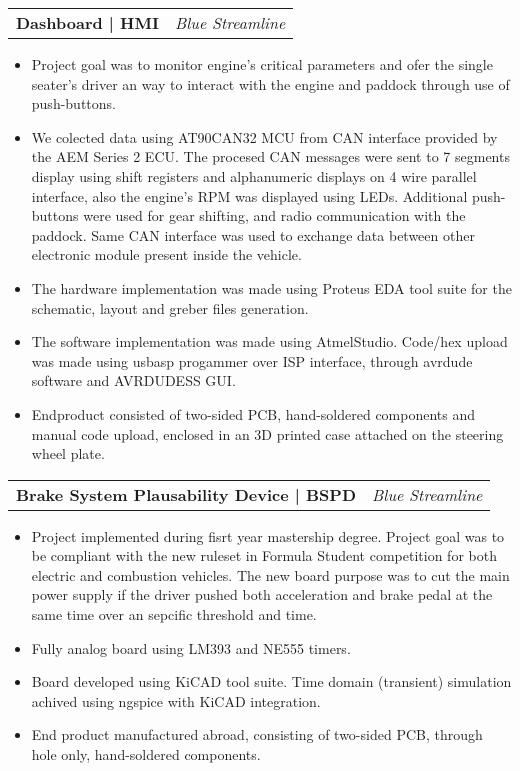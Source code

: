 \documentclass[letterpaper,11pt]{article}
\makeatletter
\newcommand{\resumeItem}[1]{
  \item\small{
    {#1 \vspace{-2pt}}
  }
}
\newcommand{\resumeProjectHeading}[2]{
    \vspace{-2pt}\item
    \begin{tabular*}{0.97\textwidth}{l@{\extracolsep{\fill}}r}
      \small#1 & #2 \\
    \end{tabular*}\vspace{-7pt}
}
\newcommand{\resumeItemListStart}{\begin{itemize}}
\newcommand{\resumeItemListEnd}{\end{itemize}\vspace{-5pt}}
\makeatother
\begin{document}
      \resumeProjectHeading
        {\textbf{Dashboard | HMI}}{\textit{Blue Streamline}}
          \resumeItemListStart
            \resumeItem{Project goal was to monitor engine's critical parameters and ofer the single seater's driver
                        an way to interact with the engine and paddock through use of push-buttons.}
            \resumeItem{We colected data using AT90CAN32 MCU from CAN interface provided by the
                        AEM Series 2 ECU. The procesed CAN messages were sent to 7 segments display using shift registers 
                        and alphanumeric displays on 4 wire parallel interface, also the engine's RPM was displayed using LEDs.
                        Additional push-buttons were used for gear shifting, and radio communication with the paddock.
                        Same CAN interface was used to exchange data between other electronic module present inside the vehicle.}
            \resumeItem{The hardware implementation was made using Proteus EDA tool suite for the schematic, layout
                        and greber files generation.}
            \resumeItem{The software implementation was made using AtmelStudio.
                        Code/hex upload was made using usbasp progammer over ISP interface, through avrdude software
                        and AVRDUDESS GUI.}
            \resumeItem{Endproduct consisted of two-sided PCB, hand-soldered components and manual code upload, 
                        enclosed in an 3D printed case attached on the steering wheel plate.}
          \resumeItemListEnd
      
      \resumeProjectHeading
        {\textbf{Brake System Plausability Device | BSPD}}{\textit{Blue Streamline}}
          \resumeItemListStart
            \resumeItem{Project implemented during fisrt year mastership degree.
                        Project goal was to be compliant with the new ruleset in Formula Student competition 
                        for both electric and combustion vehicles. The new board purpose was to cut the main power supply
                        if the driver pushed both acceleration and brake pedal at the same time over an sepcific threshold and time.}
            \resumeItem{Fully analog board using LM393 and NE555 timers.}
            \resumeItem{Board developed using KiCAD tool suite.
                        Time domain (transient) simulation achived using ngspice with KiCAD integration.}
            \resumeItem{End product manufactured abroad, consisting of two-sided PCB, 
                        through hole only, hand-soldered components.}
          \resumeItemListEnd
\end{document}
